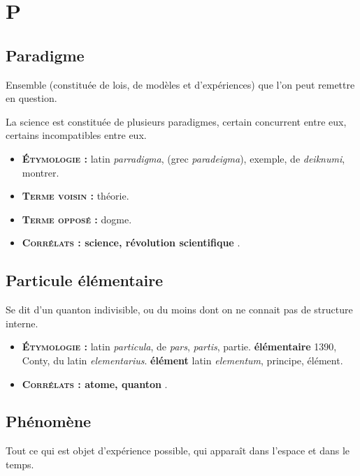 \chapter{P}
\section{Paradigme}
Ensemble (constituée de lois, de modèles et d'expériences) que l'on peut remettre en question.

La science est constituée de plusieurs paradigmes, certain concurrent entre eux, certains incompatibles entre eux.

{\footnotesize
\begin{itemize}[leftmargin=1cm, label=, itemsep=1pt]
\item {\bf \textsc{Étymologie} :} latin {\it parradigma}, (grec {\it paradeigma}), exemple,
de {\it deiknumi}, montrer.
\item {\bf \textsc{Terme voisin} :} théorie.
\item {\bf \textsc{Terme opposé} :} dogme.
\item {\bf \textsc{Corrélats} : science, révolution scientifique} .
\end{itemize}
}

\section{Particule élémentaire}
Se dit d'un quanton indivisible, ou du moins dont on ne connait pas de structure interne.
{\footnotesize
\begin{itemize}[leftmargin=1cm, label=, itemsep=1pt]
\item {\bf \textsc{Étymologie} :} latin {\it particula}, de {\it pars}, {\it partis}, partie.
{\bf élémentaire} 1390, Conty, du latin {\it elementarius}.
{\bf élément} latin {\it elementum}, principe, élément.
\item {\bf \textsc{Corrélats} : atome, quanton} .
\end{itemize}
}

\section{Phénomène}
Tout ce qui est objet d'expérience possible, qui apparaît dans l'espace et dans le temps.

